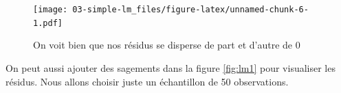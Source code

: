 \documentclass[
]{book}
\newenvironment{Shaded}{\begin{snugshade}}{\end{snugshade}}
\newcommand{\AttributeTok}[1]{\textcolor[rgb]{0.77,0.63,0.00}{#1}}
\newcommand{\ConstantTok}[1]{\textcolor[rgb]{0.00,0.00,0.00}{#1}}
\newcommand{\DecValTok}[1]{\textcolor[rgb]{0.00,0.00,0.81}{#1}}
\newcommand{\FunctionTok}[1]{\textcolor[rgb]{0.00,0.00,0.00}{#1}}
\newcommand{\NormalTok}[1]{#1}
\newcommand{\OtherTok}[1]{\textcolor[rgb]{0.56,0.35,0.01}{#1}}
\newcommand{\SpecialCharTok}[1]{\textcolor[rgb]{0.00,0.00,0.00}{#1}}
\newcommand{\StringTok}[1]{\textcolor[rgb]{0.31,0.60,0.02}{#1}}
\begin{document}
\begin{Shaded}
\end{Shaded}

\begin{figure}
\centering
\texttt{[image: 03-simple-lm\_files/figure-latex/unnamed-chunk-6-1.pdf]}
\caption{\label{fig:unnamed-chunk-6}On voit bien que nos résidus se disperse de part et d'autre de 0}
\end{figure}

On peut aussi ajouter des sagements dans la figure \ref{fig:lm1} pour
visualiser les résidus. Nous allons choisir juste un échantillon de 50
observations.
\end{document}

